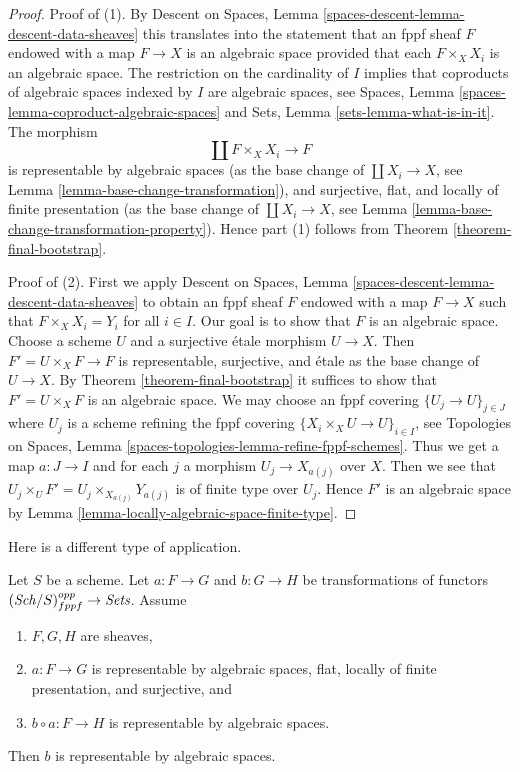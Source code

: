\begin{proof}
Proof of (1). By
Descent on Spaces, Lemma \ref{spaces-descent-lemma-descent-data-sheaves}
this translates into the statement that an fppf sheaf $F$
endowed with a map $F \to X$ is an algebraic space provided that
each $F \times_X X_i$ is an algebraic space.
The restriction on the cardinality of $I$ implies that
coproducts of algebraic spaces indexed by $I$ are algebraic spaces, see
Spaces, Lemma \ref{spaces-lemma-coproduct-algebraic-spaces}
and
Sets, Lemma \ref{sets-lemma-what-is-in-it}.
The morphism
$$
\coprod F \times_X X_i \longrightarrow F
$$
is representable by algebraic spaces (as the base change of
$\coprod X_i \to X$, see Lemma \ref{lemma-base-change-transformation}),
and surjective, flat, and locally of finite presentation
(as the base change of $\coprod X_i \to X$, see
Lemma \ref{lemma-base-change-transformation-property}).
Hence part (1) follows from Theorem \ref{theorem-final-bootstrap}.

\medskip\noindent
Proof of (2). First we apply
Descent on Spaces, Lemma \ref{spaces-descent-lemma-descent-data-sheaves}
to obtain an fppf sheaf $F$ endowed with a map $F \to X$
such that $F \times_X X_i = Y_i$ for all $i \in I$.
Our goal is to show that $F$ is an algebraic space.
Choose a scheme $U$ and a surjective \'etale morphism $U \to X$.
Then $F' = U \times_X F \to F$ is representable, surjective, and \'etale
as the base change of $U \to X$.
By Theorem \ref{theorem-final-bootstrap} it suffices to show
that $F' = U \times_X F$ is an algebraic space.
We may choose an fppf covering $\{U_j \to U\}_{j \in J}$
where $U_j$ is a scheme refining the fppf covering
$\{X_i \times_X U \to U\}_{i \in I}$, see
Topologies on Spaces, Lemma
\ref{spaces-topologies-lemma-refine-fppf-schemes}.
Thus we get a map $a : J \to I$ and for each $j$
a morphism $U_j \to X_{a(j)}$ over $X$.
Then we see that $U_j \times_U F' = U_j \times_{X_{a(j)}} Y_{a(j)}$
is of finite type over $U_j$. Hence $F'$ is an algebraic
space by Lemma \ref{lemma-locally-algebraic-space-finite-type}.
\end{proof}

\noindent
Here is a different type of application.

\begin{lemma}
\label{lemma-representable-by-spaces-cover}
Let $S$ be a scheme. Let $a : F \to G$ and $b : G \to H$ be
transformations of functors $(\mathit{Sch}/S)_{fppf}^{opp} \to \textit{Sets}$.
Assume
\begin{enumerate}
\item $F, G, H$ are sheaves,
\item $a : F \to G$ is representable by algebraic spaces, flat,
locally of finite presentation, and surjective, and
\item $b \circ a : F \to H$ is representable by algebraic spaces.
\end{enumerate}
Then $b$ is representable by algebraic spaces.
\end{lemma}

